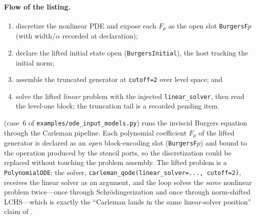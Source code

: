 \paragraph{Flow of the listing.}
\begin{enumerate}
\item discretize the nonlinear PDE and expose each $F_p$ as the open slot
  \texttt{BurgersF$p$} (with width/$\alpha$ recorded at declaration);
\item declare the lifted initial state open
  (\texttt{BurgersInitial}), the host tracking the initial norm;
\item assemble the truncated generator at \texttt{cutoff=2} over level
  space; and
\item solve the lifted \emph{linear} problem with the injected
  \texttt{linear\_solver}, then read the level-one block; the truncation
  tail is a recorded pending item.
\end{enumerate}

 (case~6 of \texttt{examples/ode\_input\_models.py})
runs the inviscid Burgers equation through the Carleman pipeline.  Each
polynomial coefficient $F_p$ of the lifted generator is declared as an
\emph{open} block-encoding slot (\texttt{BurgersF$p$}) and bound to the
operation produced by the stencil ports, so the discretization could be
replaced without touching the problem assembly.  The lifted problem is a
\texttt{PolynomialODE}; the solver,
\texttt{carleman\_qode(linear\_solver=..., cutoff=2)}, receives the linear
solver as an argument, and the loop solves the \emph{same} nonlinear
problem twice---once through Schr\"odingerization and once through
norm-shifted LCHS---which is exactly the ``Carleman lands in the same
linear-solver position'' claim of .

